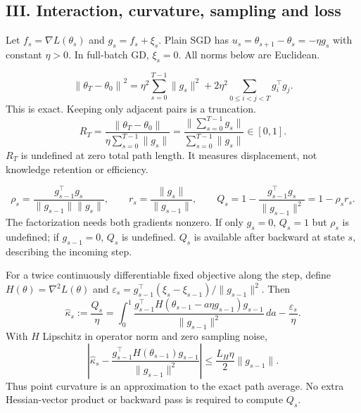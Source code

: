 \subsection*{III. Interaction, curvature, sampling and loss}
Let $f_s=\nabla L(\theta_s)$ and $g_s=f_s+\xi_s$. Plain SGD has
$u_s=\theta_{s+1}-\theta_s=-\eta g_s$ with constant $\eta>0$.
In full-batch GD, $\xi_s=0$. All norms below are Euclidean.

\begin{equation}
\left\|\theta_T-\theta_0\right\|^2
=\eta^2\sum_{s=0}^{T-1}\|g_s\|^2
+2\eta^2\sum_{0\leq i<j<T}g_i^\top g_j .
\label{consol:all-pairs}
\end{equation}
This is exact. Keeping only adjacent pairs is a truncation.
\begin{equation}
R_T=\frac{\|\theta_T-\theta_0\|}{\eta\sum_{s=0}^{T-1}\|g_s\|}
=\frac{\|\sum_{s=0}^{T-1}g_s\|}{\sum_{s=0}^{T-1}\|g_s\|}\in[0,1].
\label{consol:retention}
\end{equation}
$R_T$ is undefined at zero total path length. It measures displacement,
not knowledge retention or efficiency.

\begin{equation}
\rho_s=\frac{g_{s-1}^\top g_s}{\|g_{s-1}\|\|g_s\|},\qquad
r_s=\frac{\|g_s\|}{\|g_{s-1}\|},\qquad
Q_s=1-\frac{g_{s-1}^\top g_s}{\|g_{s-1}\|^2}=1-\rho_s r_s .
\label{consol:observable}
\end{equation}
The factorization needs both gradients nonzero. If only $g_s=0$, $Q_s=1$
but $\rho_s$ is undefined; if $g_{s-1}=0$, $Q_s$ is undefined.
$Q_s$ is available after backward at state $s$, describing the incoming step.

For a twice continuously differentiable fixed objective along the step, define
$H(\theta)=\nabla^2L(\theta)$ and
$\varepsilon_s=g_{s-1}^\top(\xi_s-\xi_{s-1})/\|g_{s-1}\|^2$. Then
\begin{equation}
\widehat\kappa_s:=\frac{Q_s}{\eta}
=\int_0^1
\frac{g_{s-1}^\top H(\theta_{s-1}-a\eta g_{s-1})g_{s-1}}
{\|g_{s-1}\|^2}\,da-\frac{\varepsilon_s}{\eta}.
\label{consol:path-curvature}
\end{equation}
With $H$ Lipschitz in operator norm and zero sampling noise,
\begin{equation}
\left|\widehat\kappa_s-
\frac{g_{s-1}^\top H(\theta_{s-1})g_{s-1}}{\|g_{s-1}\|^2}\right|
\leq\frac{L_H\eta}{2}\|g_{s-1}\|.
\label{consol:curvature-error}
\end{equation}
Thus point curvature is an approximation to the exact path average.
No extra Hessian-vector product or backward pass is required to compute $Q_s$.

